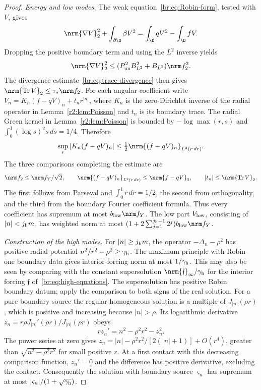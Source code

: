 \begin{proof}
\emph{Energy and low modes.}
The weak equation~\eqref{br:eq:Robin-form}, tested with $V$, gives
\[
 \nrm{\nabla V}_2^2+\int_{\partial\D}\beta V^2
 =\int_\D qV^2-\int_\D fV.
\]
Dropping the positive boundary term and using the $L^2$ inverse yields
\[
 \nrm{\nabla V}_2^2
 \le(P_{\rm un}^2B_{L^2}^2+B_{L^2})\nrm f_2^2.
\]
The divergence estimate~\eqref{br:eq:trace-divergence} then gives
$\nrm{\operatorname{Tr}V}_2\le\tau_*\nrm f_2$.
For each angular coefficient write
$V_n=K_n(f-qV)_n+t_nr^{|n|}$, where $K_n$ is the zero-Dirichlet inverse of the radial operator in
Lemma~\ref{r2:lem:Poisson} and $t_n$ is its boundary trace.
The radial Green kernel in Lemma~\ref{r2:lem:Poisson} is bounded by
$-\log\max(r,s)$ and
$\int_0^1(\log s)^2s\,ds=1/4$. Therefore
\[
 \sup_r|K_n(f-qV)_n|\le\tfrac12\nrm{(f-qV)_n}_{L^2(r\,dr)}.
\]
The three comparisons completing the estimate are
\[
 \nrm f_2\le\nrm f_Y/\sqrt2,\qquad
 \nrm{(f-qV)_n}_{L^2(r\,dr)}\le\nrm{f-qV}_2,
 \qquad |t_n|\le\nrm{\operatorname{Tr}V}_2.
\]
The first follows from Parseval and $\int_0^1r\,dr=1/2$, the second
from orthogonality, and the third from the boundary Fourier coefficient
formula. Thus every coefficient has supremum at most
$b_{\rm low}\nrm f_Y$. The low part $V_{\rm low}$, consisting of $|n|<j_{\rm h}m$,
has weighted norm at most
$(1+2\sum_{j=1}^{j_{\rm h}-1}2^j)b_{\rm low}\nrm f_Y$.

\emph{Construction of the high modes.}
For $|n|\ge j_{\rm h}m$, the operator $-\Delta_n-\rho^2$ has positive radial
potential $n^2/r^2-\rho^2\ge\gamma_{\rm h}$. The maximum principle with
Robin-one boundary data gives interior-forcing norm at most
$1/\gamma_{\rm h}$. This may also be seen by comparing with the constant
supersolution $\nrm{\mathfrak f}_\infty/\gamma_{\rm h}$ for the interior forcing
$\mathfrak f$ of~\eqref{br:eq:high-equations}. The supersolution has
positive Robin boundary datum; apply the comparison to both signs of the real solution.
For a pure boundary source the regular homogeneous solution is a multiple
of $J_{|n|}(\rho r)$, which is positive and increasing because $|n|>\rho$.
Its logarithmic derivative
$z_n=r\rho J_{|n|}'(\rho r)/J_{|n|}(\rho r)$ obeys
\[
 rz_n'=n^2-\rho^2r^2-z_n^2.
\]
The power series at zero gives
$z_n=|n|-\rho^2r^2/[2(|n|+1)]+O(r^4)$, greater than
$\sqrt{n^2-\rho^2r^2}$ for small positive $r$. At a first contact with
this decreasing comparison function, $z_n'=0$ and the difference has
positive derivative, excluding the contact. Consequently the solution
with boundary source $\varsigma_n$ has supremum at most
$|\varsigma_n|/(1+\sqrt{\gamma_{\rm h}})$.


\end{proof}
